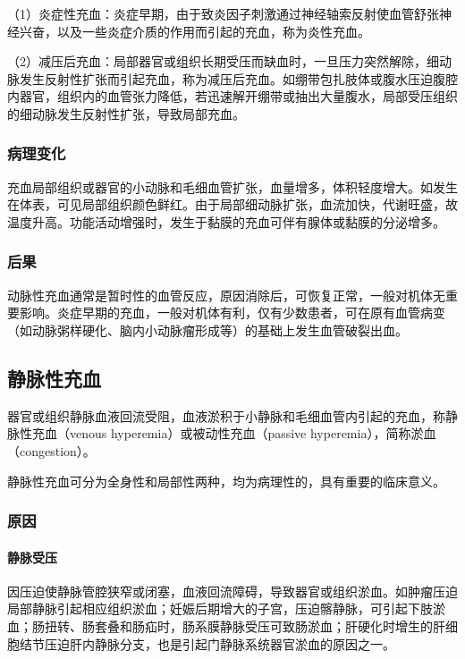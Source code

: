 （1）炎症性充血：炎症早期，由于致炎因子刺激通过神经轴索反射使血管舒张神经兴奋，以及一些炎症介质的作用而引起的充血，称为炎性充血。

（2）减压后充血：局部器官或组织长期受压而缺血时，一旦压力突然解除，细动脉发生反射性扩张而引起充血，称为减压后充血。如绷带包扎肢体或腹水压迫腹腔内器官，组织内的血管张力降低，若迅速解开绷带或抽出大量腹水，局部受压组织的细动脉发生反射性扩张，导致局部充血。

\subsubsection{病理变化}

充血局部组织或器官的小动脉和毛细血管扩张，血量增多，体积轻度增大。如发生在体表，可见局部组织颜色鲜红。由于局部细动脉扩张，血流加快，代谢旺盛，故温度升高。功能活动增强时，发生于黏膜的充血可伴有腺体或黏膜的分泌增多。

\subsubsection{后果}

动脉性充血通常是暂时性的血管反应，原因消除后，可恢复正常，一般对机体无重要影响。炎症早期的充血，一般对机体有利，仅有少数患者，可在原有血管病变（如动脉粥样硬化、脑内小动脉瘤形成等）的基础上发生血管破裂出血。

\subsection{静脉性充血}

器官或组织静脉血液回流受阻，血液淤积于小静脉和毛细血管内引起的充血，称静脉性充血（venous
hyperemia）或被动性充血（passive hyperemia），简称淤血（congestion）。

静脉性充血可分为全身性和局部性两种，均为病理性的，具有重要的临床意义。

\subsubsection{原因}

\paragraph{静脉受压}
因压迫使静脉管腔狭窄或闭塞，血液回流障碍，导致器官或组织淤血。如肿瘤压迫局部静脉引起相应组织淤血；妊娠后期增大的子宫，压迫髂静脉，可引起下肢淤血；肠扭转、肠套叠和肠疝时，肠系膜静脉受压可致肠淤血；肝硬化时增生的肝细胞结节压迫肝内静脉分支，也是引起门静脉系统器官淤血的原因之一。

